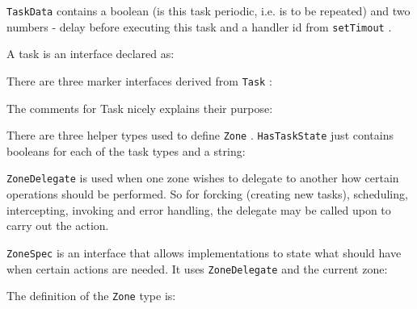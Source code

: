 

\texttt{TaskData}
contains a boolean (is this task periodic, i.e. is to be repeated) and two
numbers - delay before executing this task and a handler id from
\texttt{setTimout}
.



A task is an interface declared as:



There are three marker interfaces derived from
\texttt{Task}
:



The comments for Task nicely explains their purpose:



There are three helper types used to define
\texttt{Zone}
.
\texttt{HasTaskState}
just contains
booleans for each of the task types and a string:



\texttt{ZoneDelegate}
is used when one zone wishes to delegate to another how certain
operations should be performed. So for forcking (creating new tasks), scheduling,
intercepting, invoking and error handling, the delegate may be called upon to carry
out the action.



\texttt{ZoneSpec}
is an interface that allows implementations to state what should have when
certain actions are needed. It uses
\texttt{ZoneDelegate}
and the current zone:



The definition of the
\texttt{Zone}
type is:






